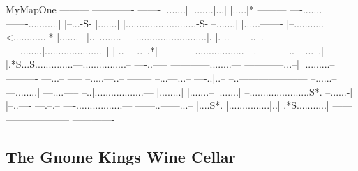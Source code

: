 \begin{SaveVerbatim}{MyMapOne}
                         ---------     -------------       -------
                         |.......|     |.......|...|       |.....|*
     ---------        ----.......-------...........|       |--...-S-
     |.......|        |..........................-S-      --.......|
     |......-------   |--...........<............|*       |.......--
     |..--........-----..........................|.       |.-..----
     --..--.-----........|.....................--|        |-..--
      --..--.*| -----------..................---.----------..--
       |...--.|    |.*S...S..............---................--
      ----..-----  ------------........--- ------------...--|
      |.........--            ----------              ---...-- -----
     --.....---..--                           --------  --...---...--
  ----..|..-- --..---------------------      --......--  ---........|
---....-----   --..|..................---    |........|    |.......--
|.......|       --......................S*.  --......-|    |--..---- 
---.--.--        ----.................---     ------..------...--    
  |....S*.          |...............|..|         .*S...........|     
  ------            --------------------           -------------  
\end{SaveVerbatim}
\subsection{The Gnome King\textquotesingle{}s Wine Cellar}

